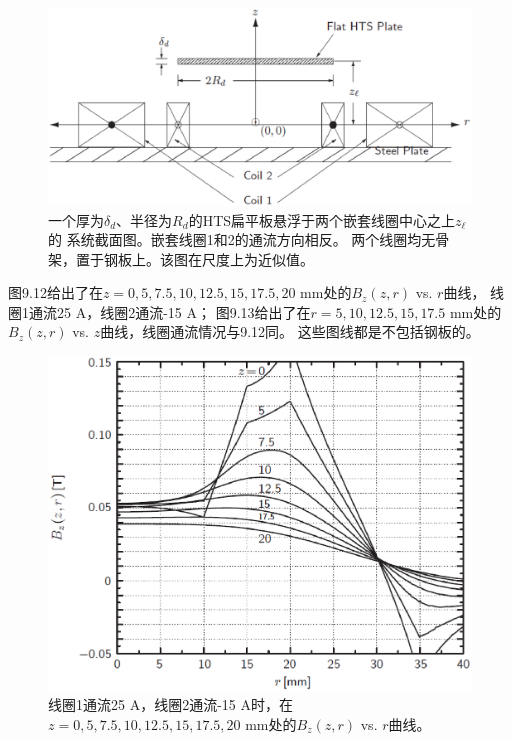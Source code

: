 \begin{figure}
	\centering
	\includegraphics[scale=0.5]{chpt9/figs/fig9.11.eps}
	\caption{一个厚为$\delta_d$、半径为$R_d$的HTS扁平板悬浮于两个嵌套线圈中心之上$z_\ell$的
		系统截面图。嵌套线圈1和2的通流方向相反。
		两个线圈均无骨架，置于钢板上。该图在尺度上为近似值。}
\end{figure}

图9.12给出了在$z=0,5,7.5,10,12.5,15,17.5,20$ mm处的$B_z(z,r)$ vs. $r$曲线，
线圈1通流25 A，线圈2通流-15 A；
图9.13给出了在$r=5,10,12.5,15,17.5$ mm处的$B_z(z,r)$ vs. $z$曲线，线圈通流情况与9.12同。
这些图线都是不包括钢板的。

\begin{figure}
	\centering
	\includegraphics[scale=0.5]{chpt9/figs/fig9.12.eps}
	\caption{线圈1通流25 A，线圈2通流-15 A时，在$z=0,5,7.5,10,12.5,15,17.5,20$ mm处的$B_z(z,r)$ vs. $r$曲线。}
\end{figure}


